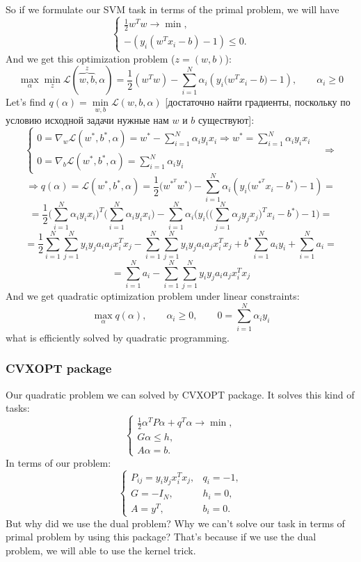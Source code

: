 So if we formulate our SVM task in terms of the primal problem, we will have
$$\begin{cases}
	\frac{1}{2}w^Tw\to\min, \\
	-(y_i(w^Tx_i-b)-1)\le0.
\end{cases}$$
And we get this optimization problem ($z=(w,b)$):
$$\max\limits_{\alpha}\min\limits_{z}\mathcal{L}(\overbrace{w,b}^z,\alpha)=\frac{1}{2}(w^Tw)-\sum\limits_{i=1}^{N}\alpha_i(y_i\big(w^Tx_i-b\big)-1),\qquad\alpha_i\ge0$$
Let's find $q(\alpha)=\min\limits_{w,b}\mathcal{L}(w,b,\alpha)$ [достаточно найти градиенты, поскольку по условию исходной задачи нужные нам $w$ и $b$ существуют]:
$$\begin{cases}
	0=\nabla_w\mathcal{L}(w^*,b^*,\alpha)=w^*-\sum\limits_{i=1}^{N}\alpha_iy_ix_i\Rightarrow w^*=\sum\limits_{i=1}^{N}\alpha_iy_ix_i &  \\
	0=\nabla_b\mathcal{L}(w^*,b^*,\alpha)=\sum\limits_{i=1}^{N}\alpha_iy_i & 
\end{cases}\Longrightarrow$$
$$\Longrightarrow q(\alpha)=\mathcal{L}(w^*,b^*,\alpha)=\frac{1}{2}\big(w^{*^T}w^*\big)-\sum\limits_{i=1}^{N}\alpha_i(y_i\big(w^{*^T}x_i-b^*\big)-1)=$$
$$=\frac{1}{2}\Big(\sum\limits_{i=1}^{N}\alpha_iy_ix_i\Big)^T\Big(\sum\limits_{i=1}^{N}\alpha_iy_ix_i\Big)-\sum\limits_{i=1}^{N}\alpha_i\big(y_i\Big(\Big(\sum\limits_{j=1}^{N}\alpha_jy_jx_j\Big)^Tx_i-b^*\Big)-1\big)=$$
$$=\frac{1}{2}\sum\limits_{i=1}^{N}\sum\limits_{j=1}^{N}y_iy_ja_ia_jx_i^Tx_j-\sum\limits_{i=1}^{N}\sum\limits_{j=1}^{N}y_iy_ja_ia_jx_i^Tx_j+b^*\sum\limits_{i=1}^{N}a_iy_i+\sum\limits_{i=1}^{N}a_i=$$
$$=\sum\limits_{i=1}^{N}a_i-\sum\limits_{i=1}^{N}\sum\limits_{j=1}^{N}y_iy_ja_ia_jx_i^Tx_j$$
And we get quadratic optimization problem under linear constraints:
$$\max\limits_{\alpha}q(\alpha),\qquad\alpha_i\ge0,\qquad 0=\sum\limits_{i=1}^{N}\alpha_iy_i$$
what is efficiently solved by quadratic programming.

\subsubsection*{CVXOPT package}

Our quadratic problem we can solved by CVXOPT package. It solves this kind of tasks:
$$\begin{cases}
	\frac{1}{2}\alpha^TP\alpha+q^T\alpha\to\min,\\
	G\alpha\le h, \\
	A\alpha=b.
\end{cases}$$
In terms of our problem:
$$\begin{cases}
	P_{ij}=y_iy_jx_i^Tx_j, & q_i=-1, \\
	G=-I_N, & h_i = 0, \\
	A=y^T, & b_i = 0.
\end{cases}$$
But why did we use the dual problem? Why we can't solve our task in terms of primal problem by using this package? That's because if we use the dual problem, we will able to use the kernel trick.

